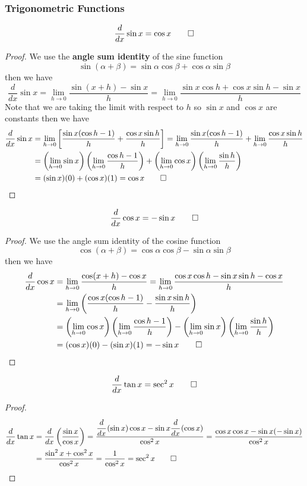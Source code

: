 \subsubsection{Trigonometric Functions}
\begin{theorem}
    \[\frac{d}{dx}\sin x=\cos x\qedhere\]
\end{theorem}
\begin{proof}
    We use the \textbf{angle sum identity} of the sine function
    \[\sin(\alpha+\beta)=\sin\alpha\cos\beta+\cos\alpha\sin\beta\] then we have
    \[\frac{d}{dx}\sin x=\lim_{h\to 0}\frac{\sin(x+h)-\sin x}{h}
    =\lim_{h\to 0}\frac{\sin x\cos h+\cos x\sin h-\sin x}{h}\]
    Note that we are taking the limit with respect to \(h\) so \(\sin x\) and
    \(\cos x\) are constants then we have
    \begin{align*}
        \frac{d}{dx}\sin x
        &=\lim_{h\to 0}\left[\frac{\sin x(\cos h-1)}{h}+\frac{\cos x\sin h}{h}\right]
        =\lim_{h\to 0}\frac{\sin x(\cos h-1)}{h}+\lim_{h\to 0}\frac{\cos x\sin h}{h} \\
        &=\left(\lim_{h\to 0}\sin x\right)\left(\lim_{h\to 0}\frac{\cos h-1}{h}\right)
        +\left(\lim_{h\to 0}\cos x\right)\left(\lim_{h\to 0}\frac{\sin h}{h}\right) \\
        &=(\sin x)(0)+(\cos x)(1) =\cos x\qedhere
    \end{align*}
\end{proof}
\begin{theorem}
    \[\frac{d}{dx}\cos x=-\sin x\qedhere\]
\end{theorem}
\begin{proof}
    We use the angle sum identity of the cosine function
    \[\cos(\alpha+\beta)=\cos\alpha\cos\beta-\sin\alpha\sin\beta\] then we have
    \begin{align*}
        \frac{d}{dx}\cos x&=\lim_{h\to 0}\frac{\cos(x+h)-\cos x}{h}
        =\lim_{h\to 0}\frac{\cos x\cos h-\sin x\sin h-\cos x}{h} \\
        &=\lim_{h\to 0}\left(\frac{\cos x(\cos h-1)}{h}-\frac{\sin x\sin h}{h}\right) \\
        &=\left(\lim_{h\to 0}\cos x\right)\left(\lim_{h\to 0}\frac{\cos h-1}{h}\right)
        -\left(\lim_{h\to 0}\sin x\right)\left(\lim_{h\to 0}\frac{\sin h}{h}\right) \\
        &=(\cos x)(0)-(\sin x)(1)=-\sin x\qedhere
    \end{align*}
\end{proof}
\begin{theorem}
    \[\frac{d}{dx}\tan x=\sec^2 x\qedhere\]
\end{theorem}
\begin{proof}
    \begin{align*}
        \frac{d}{dx}\tan x&=\frac{d}{dx}\left(\frac{\sin x}{\cos x}\right)
        =\frac{\cfrac{d}{dx}\left(\sin x\right)\cos x
        -\sin x\cfrac{d}{dx}\left(\cos x\right)}{\cos^2 x}
        =\frac{\cos x\cos x-\sin x(-\sin x)}{\cos^2 x} \\
        &=\frac{\sin^2 x+\cos^2 x}{\cos^2 x}=\frac{1}{\cos^2 x}=\sec^2 x\qedhere
    \end{align*}
\end{proof}

